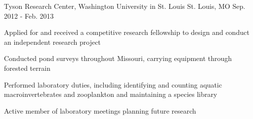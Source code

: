 \begin{cventries}
    {Tyson Research Center, Washington University in St. Louis} %
    {St. Louis, MO} %
    {Sep. 2012 - Feb. 2013} %
    {
      \begin{cvitems} %
        \item {Applied for and received a competitive research fellowship to design and conduct an independent research project}
        \item {Conducted pond surveys throughout Missouri, carrying equipment through forested terrain}
        \item {Performed laboratory duties, including identifying and counting aquatic macroinvertebrates and zooplankton and maintaining a species library}
        \item {Active member of laboratory meetings planning future research}
      \end{cvitems} 
    }

\end{cventries}
